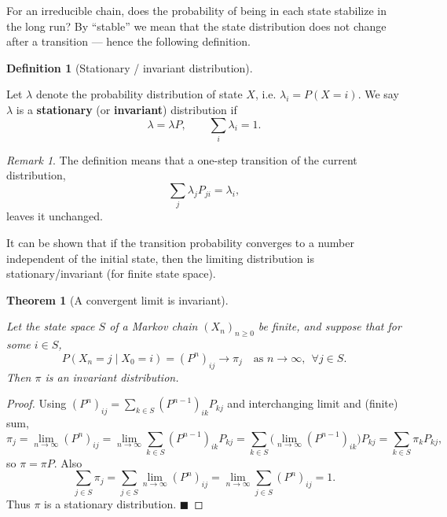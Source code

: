 \documentclass[
  letterpaper,
  DIV=11,
  numbers=noendperiod]{scrreprt}
\theoremstyle{definition}
\newtheorem{definition}{Definition}[chapter]
\theoremstyle{plain}
\newtheorem{theorem}{Theorem}[chapter]
\theoremstyle{plain}
\theoremstyle{definition}
\theoremstyle{plain}
\theoremstyle{plain}
\theoremstyle{remark}
\newtheorem*{remark}{Remark}
\begin{document}
For an irreducible chain, does the probability of being in each state
stabilize in the long run? By ``stable'' we mean that the state
distribution does not change after a transition --- hence the following
definition.

\begin{definition}[Stationary / invariant
distribution]\protect\hypertarget{def-stationary}{}\label{def-stationary}

Let \(\lambda\) denote the probability distribution of state \(X\), i.e.
\(\lambda_i = P(X = i)\). We say \(\lambda\) is a \textbf{stationary}
(or \textbf{invariant}) distribution if \[
\lambda = \lambda P, \qquad \sum_i \lambda_i = 1 .
\]

\end{definition}

\begin{remark}
The definition means that a one-step transition of the current
distribution, \[
\sum_j \lambda_j P_{ji} = \lambda_i ,
\] leaves it unchanged.
\end{remark}

It can be shown that if the transition probability converges to a number
independent of the initial state, then the limiting distribution is
stationary/invariant (for finite state space).

\begin{theorem}[A convergent limit is
invariant]\protect\hypertarget{thm-converge-invariant}{}\label{thm-converge-invariant}

Let the state space \(S\) of a Markov chain \((X_n)_{n \ge 0}\) be
finite, and suppose that for some \(i \in S\), \[
P(X_n = j \mid X_0 = i) = (P^n)_{ij} \to \pi_j \quad\text{as } n \to \infty, \ \ \forall j \in S .
\] Then \(\pi\) is an invariant distribution.

\end{theorem}

\begin{proof}
Using \((P^n)_{ij} = \sum_{k \in S} (P^{n-1})_{ik} P_{kj}\) and
interchanging limit and (finite) sum, \[
\pi_j = \lim_{n \to \infty} (P^n)_{ij}
= \lim_{n \to \infty} \sum_{k \in S} (P^{n-1})_{ik} P_{kj}
= \sum_{k \in S} \Big(\lim_{n \to \infty} (P^{n-1})_{ik}\Big) P_{kj}
= \sum_{k \in S} \pi_k P_{kj} ,
\] so \(\pi = \pi P\). Also \[
\sum_{j \in S} \pi_j
= \sum_{j \in S} \lim_{n \to \infty} (P^n)_{ij}
= \lim_{n \to \infty} \sum_{j \in S} (P^n)_{ij} = 1 .
\] Thus \(\pi\) is a stationary distribution. \(\blacksquare\)
\end{proof}
\end{document}
